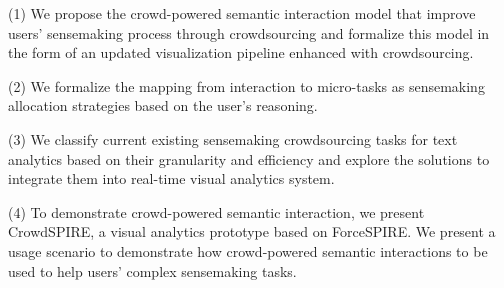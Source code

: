 \documentclass[journal]{vgtc}                %
\begin{document}
(1) We propose the crowd-powered semantic interaction model that improve users' sensemaking process through crowdsourcing and formalize this model in the form of an updated visualization pipeline enhanced with crowdsourcing.

(2) We formalize the mapping from interaction to micro-tasks as sensemaking allocation strategies based on the user’s reasoning.

(3) We classify current existing sensemaking crowdsourcing tasks for text analytics based on their granularity and efficiency and explore the solutions to integrate them into real-time visual analytics system.

(4) To demonstrate crowd-powered semantic interaction, we present CrowdSPIRE, a visual analytics prototype based on ForceSPIRE. We present a usage scenario to demonstrate how crowd-powered semantic interactions to be used to help users' complex sensemaking tasks.
\end{document}
